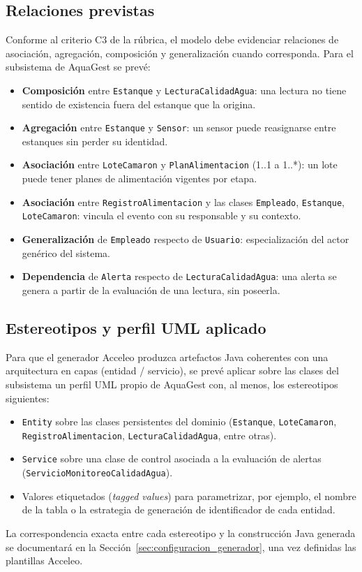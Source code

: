 \documentclass[11pt,a4paper]{article}
\begin{document}
\subsection{Relaciones previstas}
Conforme al criterio C3 de la rúbrica, el modelo debe evidenciar relaciones de asociación, agregación,
composición y generalización cuando corresponda. Para el subsistema de AquaGest se prevé:
\begin{itemize}[nosep]
  \item \textbf{Composición} entre \texttt{Estanque} y \texttt{LecturaCalidadAgua}: una lectura no
        tiene sentido de existencia fuera del estanque que la origina.
  \item \textbf{Agregación} entre \texttt{Estanque} y \texttt{Sensor}: un sensor puede reasignarse
        entre estanques sin perder su identidad.
  \item \textbf{Asociación} entre \texttt{LoteCamaron} y \texttt{PlanAlimentacion} (1..1 a 1..*): un
        lote puede tener planes de alimentación vigentes por etapa.
  \item \textbf{Asociación} entre \texttt{RegistroAlimentacion} y las clases \texttt{Empleado},
        \texttt{Estanque}, \texttt{LoteCamaron}: vincula el evento con su responsable y su contexto.
  \item \textbf{Generalización} de \texttt{Empleado} respecto de \texttt{Usuario}: especialización del
        actor genérico del sistema.
  \item \textbf{Dependencia} de \texttt{Alerta} respecto de \texttt{LecturaCalidadAgua}: una alerta se
        genera a partir de la evaluación de una lectura, sin poseerla.
\end{itemize}

\subsection{Estereotipos y perfil UML aplicado}
Para que el generador Acceleo produzca artefactos Java coherentes con una arquitectura en capas
(entidad / servicio), se prevé aplicar sobre las clases del subsistema un perfil UML propio de
AquaGest con, al menos, los estereotipos siguientes:
\begin{itemize}[nosep]
  \item \texttt{\guillemotleft Entity\guillemotright} sobre las clases persistentes del dominio (\texttt{Estanque},
        \texttt{LoteCamaron}, \texttt{RegistroAlimentacion}, \texttt{LecturaCalidadAgua}, entre otras).
  \item \texttt{\guillemotleft Service\guillemotright} sobre una clase de control asociada a la evaluación de alertas
        (\texttt{ServicioMonitoreoCalidadAgua}).
  \item Valores etiquetados (\textit{tagged values}) para parametrizar, por ejemplo, el nombre de la
        tabla o la estrategia de generación de identificador de cada entidad.
\end{itemize}
La correspondencia exacta entre cada estereotipo y la construcción Java generada se documentará en
la Sección~\ref{sec:configuracion_generador}, una vez definidas las plantillas Acceleo.
\end{document}
